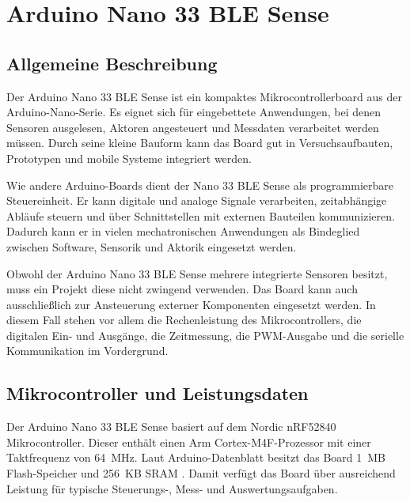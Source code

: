 %
%
%

\chapter{Arduino Nano 33 BLE Sense}

\section{Allgemeine Beschreibung}

Der Arduino Nano 33 BLE Sense ist ein kompaktes Mikrocontrollerboard aus der Arduino-Nano-Serie. Es eignet sich für eingebettete Anwendungen, bei denen Sensoren ausgelesen, Aktoren angesteuert und Messdaten verarbeitet werden müssen. Durch seine kleine Bauform kann das Board gut in Versuchsaufbauten, Prototypen und mobile Systeme integriert werden.

Wie andere Arduino-Boards dient der Nano 33 BLE Sense als programmierbare Steuereinheit. Er kann digitale und analoge Signale verarbeiten, zeitabhängige Abläufe steuern und über Schnittstellen mit externen Bauteilen kommunizieren. Dadurch kann er in vielen mechatronischen Anwendungen als Bindeglied zwischen Software, Sensorik und Aktorik eingesetzt werden.

Obwohl der Arduino Nano 33 BLE Sense mehrere integrierte Sensoren besitzt, muss ein Projekt diese nicht zwingend verwenden. Das Board kann auch ausschlie\ss lich zur Ansteuerung externer Komponenten eingesetzt werden. In diesem Fall stehen vor allem die Rechenleistung des Mikrocontrollers, die digitalen Ein- und Ausgänge, die Zeitmessung, die PWM-Ausgabe und die serielle Kommunikation im Vordergrund.



\section{Mikrocontroller und Leistungsdaten}

Der Arduino Nano 33 BLE Sense basiert auf dem Nordic nRF52840 Mikrocontroller. Dieser enthält einen Arm Cortex-M4F-Prozessor mit einer Taktfrequenz von 64~MHz. Laut Arduino-Datenblatt besitzt das Board 1~MB Flash-Speicher und 256~KB SRAM \cite{ArduinoNano:2026}. Damit verfügt das Board über ausreichend Leistung für typische Steuerungs-, Mess- und Auswertungsaufgaben.

